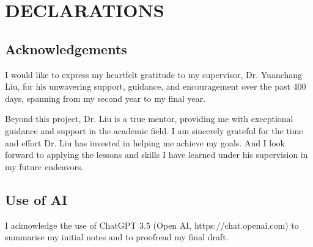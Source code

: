 \section{DECLARATIONS}
\label{sec:declarations}
\subsection{Acknowledgements}
I would like to express my heartfelt gratitude to my supervisor, Dr. Yuanchang Liu, 
for his unwavering support, guidance, and encouragement over the past 400 days, 
spanning from my second year to my final year. 

Beyond this project, Dr. Liu is a true mentor, 
providing me with exceptional guidance and support in the academic field. 
I am sincerely grateful for the time and effort Dr. Liu has invested in helping me achieve my goals. 
And I look forward to applying the lessons and skills I have learned under his supervision in my future endeavors.
\subsection{Use of AI}
I acknowledge the use of ChatGPT 3.5 (Open AI, https://chat.openai.com) to summarise my initial notes and to proofread my final draft.
